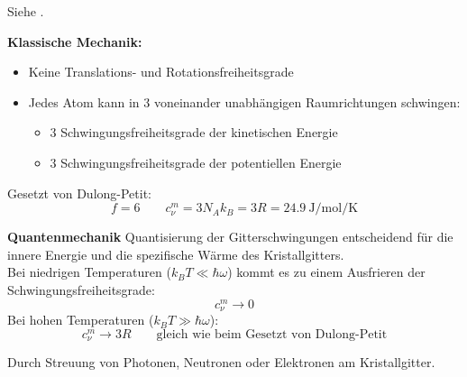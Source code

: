 \label{q:15}

Siehe .

\label{q:16}


\textbf{Klassische Mechanik:}
\begin{itemize}
    \item Keine Translations- und Rotationsfreiheitsgrade
    \item Jedes Atom kann in 3 voneinander unabhängigen Raumrichtungen schwingen:
    \begin{itemize}
        \item 3 Schwingungsfreiheitsgrade der kinetischen Energie
        \item 3 Schwingungsfreiheitsgrade der potentiellen Energie
    \end{itemize}
\end{itemize}
Gesetzt von Dulong-Petit:
\begin{equation}
    f = 6 \qquad c_\nu^m = 3N_Ak_B = 3R = \SI{24.9}{\joule\per\mole\per\kelvin}
\end{equation}

\textbf{Quantenmechanik}
Quantisierung der Gitterschwingungen entscheidend für die innere Energie und
die spezifische Wärme des Kristallgitters.\\
Bei niedrigen Temperaturen ($k_BT \ll \hbar\omega$) kommt es zu einem Ausfrieren der Schwingungsfreiheitsgrade:
\begin{equation}
    c_\nu^m \rightarrow 0
\end{equation}
Bei hohen Temperaturen ($k_BT \gg \hbar\omega$):
\begin{equation}
    c_\nu^m \rightarrow 3R \qquad \text{gleich wie beim Gesetzt von Dulong-Petit}
\end{equation}


\label{q:17}

Durch Streuung von Photonen, Neutronen oder Elektronen am Kristallgitter. 

